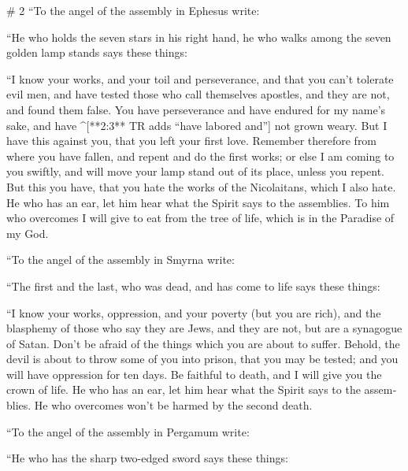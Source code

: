 \begin{paracols}{2}
\switchcolumn
\begin{english}

# 2
 “To the angel of the assembly in Ephesus write: 

“He who holds the seven stars in his right hand, he who walks among the seven golden lamp stands says these things: 

 “I know your works, and your toil and perseverance, and that you can’t tolerate evil men, and have tested those who call themselves apostles, and they are not, and found them false.  You have perseverance and have endured for my name’s sake, and have ^[**2:3** TR adds “have labored and”] not grown weary.  But I have this against you, that you left your first love.  Remember therefore from where you have fallen, and repent and do the first works; or else I am coming to you swiftly, and will move your lamp stand out of its place, unless you repent.  But this you have, that you hate the works of the Nicolaitans, which I also hate.  He who has an ear, let him hear what the Spirit says to the assemblies. To him who overcomes I will give to eat from the tree of life, which is in the Paradise of my God. 

 “To the angel of the assembly in Smyrna write: 

“The first and the last, who was dead, and has come to life says these things: 

 “I know your works, oppression, and your poverty (but you are rich), and the blasphemy of those who say they are Jews, and they are not, but are a synagogue of Satan.  Don’t be afraid of the things which you are about to suffer. Behold, the devil is about to throw some of you into prison, that you may be tested; and you will have oppression for ten days. Be faithful to death, and I will give you the crown of life.  He who has an ear, let him hear what the Spirit says to the assemblies. He who overcomes won’t be harmed by the second death. 

 “To the angel of the assembly in Pergamum write: 

“He who has the sharp two-edged sword says these things: 


\end{english}
\end{paracols}
